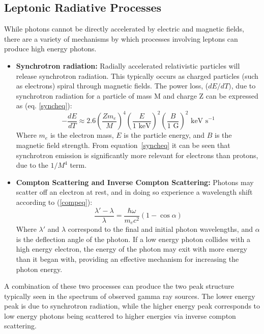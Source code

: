 \subsection{Leptonic Radiative Processes}
While photons cannot be directly accelerated by electric and magnetic fields, there are a variety of mechanisms by which processes involving leptons can produce high energy photons. 

\begin{itemize}
    \item \textbf{Synchrotron radiation:} Radially accelerated relativistic particles will release synchrotron radiation. This typically occurs as charged particles (such as electrons) spiral through magnetic fields. The power loss, ($dE/dT)$, due to synchrotron radiation for a particle of mass M and charge Z can be expressed as (eq. \ref{syncheq}):
    \begin{equation}
        -\frac{dE}{dT} \approx 2.6 (\frac{Zm_e}{M})^4(\frac{E}{\textrm{1 keV}})^2(\frac{B}{1\textrm{ G}})^2 \textrm{ keV s}^{-1}
    \label{syncheq}
    \end{equation}
    Where $m_e$ is the electron mass, $E$ is the particle energy, and $B$ is the magnetic field strength. From equation~\ref{syncheq} it can be seen that synchrotron emission is significantly more relevant for electrons than protons, due to the $1/M^4$ term.
    
    \item \textbf{Compton Scattering and Inverse Compton Scattering:} Photons may scatter off an electron at rest, and in doing so experience a wavelength shift according to (\ref{compeq}):
    \begin{equation}
        \frac{\lambda'-\lambda}{\lambda}=\frac{\hbar\omega}{m_e c^2}(1 - \cos\alpha)
    \label{compeq}
    \end{equation}
    Where $\lambda'$ and $\lambda$ correspond to the final and initial photon wavelengths, and $\alpha$ is the deflection angle of the photon. If a low energy photon collides with a high energy electron, the energy of the photon may exit with more energy than it began with, providing an effective mechanism for increasing the photon energy. 
\end{itemize}

A combination of these two processes can produce the two peak structure typically seen in the spectrum of observed gamma ray sources. The lower energy peak is due to synchrotron radiation, while the higher energy peak corresponds to low energy photons being scattered to higher energies via inverse compton scattering. 
    

